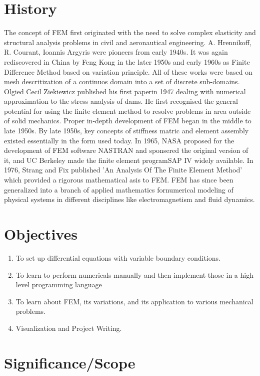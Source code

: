 \section{\bf{History}}
The concept of FEM first originated with the need to solve complex elasticity and structural analysis problems in civil and aeronautical engineering.  A. Hrennikoff, R. Courant, Ioannis Argyris were pioneers from early 1940s. It was again rediscovered in China by Feng Kong in the later 1950s and early 1960s as Finite Difference Method based on variation principle. All of these works were based on mesh descritization of a continuos domain into a set of discrete sub-domains.
	Olgied Cecil Ziekiewicz published his first paperin 1947 dealing with numerical approximation to the stress analysis of dams. He first recognised the general potential for using the finite element method to resolve problems in area outside of solid mechanics. 
	Proper in-depth development of FEM began in the middle to late 1950s. By late 1950s, key concepts of stiffness matric and element assembly existed essentially in the form used today. In 1965, NASA proposed for the development of FEM software NASTRAN and sponsered the original version of it, and UC Berkeley made the finite element programSAP IV widely available. 
	In 1976, Strang and Fix published 'An Analysis Of The Finite Element Method' which provided a rigorous mathematical asis to FEM. FEM has since been generalized into a branch of applied mathematics fornumerical modeling of physical systems in different disciplines like electromagnetism and fluid dynamics.




\section{{\bf{Objectives}}}
{\bf\color{black}
\begin{enumerate}
 \item To set up differential equations with variable boundary conditions. 
 \item  To learn to perform numericals manually and then implement
 those in a high level programming language
 \item To learn about FEM, its variations, and its application to various
 mechanical problems.
 \item Visualization and Project Writing.
\end{enumerate}
}

\section{\bf Significance/Scope}


